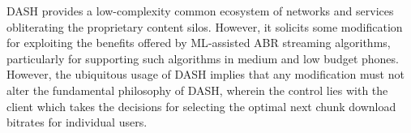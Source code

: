 \indent \ac{DASH} provides a low-complexity common ecosystem of networks and services obliterating the proprietary content silos. However, it solicits some modification for exploiting the benefits offered by \ac{ML}-assisted \ac{ABR} streaming algorithms, particularly for supporting such algorithms in medium and low budget phones. However, the ubiquitous usage of \ac{DASH} implies that any  modification must not alter the fundamental philosophy of \ac{DASH}, wherein the control lies with the client which takes the decisions for selecting the optimal next chunk download bitrates for individual users. \\
